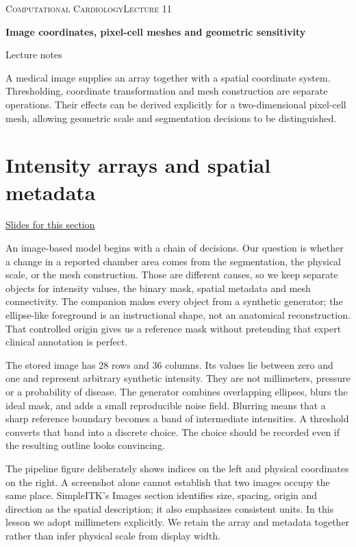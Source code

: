 \documentclass[11pt,letterpaper]{article}
\theoremstyle{definition}\newtheorem{definition}{Definition}\newtheorem{example}{Example}
\numberwithin{equation}{section}
\begin{document}
{\small\scshape Computational Cardiology\hfill Lecture 11}\par\medskip
{\raggedright{}\LARGE\bfseries\color{ink} Image coordinates, pixel-cell meshes and geometric sensitivity\par}\medskip
{\small Lecture notes}\par\bigskip
A medical image supplies an array together with a spatial coordinate system. Thresholding, coordinate transformation and mesh construction are separate operations. Their effects can be derived explicitly for a two-dimensional pixel-cell mesh, allowing geometric scale and segmentation decisions to be distinguished.

\section{Intensity arrays and spatial metadata}
\hypertarget{note-intensity-arrays-and-spatial-metadata}{}\label{note:intensity-arrays-and-spatial-metadata}
{\small \href{slides.html\#frame=an-intensity-array-and-a-geometric-image\&step=1}{Slides for this section}}\par
An image-based model begins with a chain of decisions. Our question is whether a change in a reported chamber area comes from the segmentation, the physical scale, or the mesh construction. Those are different causes, so we keep separate objects for intensity values, the binary mask, spatial metadata and mesh connectivity. The companion makes every object from a synthetic generator; the ellipse-like foreground is an instructional shape, not an anatomical reconstruction. That controlled origin gives us a reference mask without pretending that expert clinical annotation is perfect.

The stored image has 28 rows and 36 columns. Its values lie between zero and one and represent arbitrary synthetic intensity. They are not millimeters, pressure or a probability of disease. The generator combines overlapping ellipses, blurs the ideal mask, and adds a small reproducible noise field. Blurring means that a sharp reference boundary becomes a band of intermediate intensities. A threshold converts that band into a discrete choice. The choice should be recorded even if the resulting outline looks convincing.

The pipeline figure deliberately shows indices on the left and physical coordinates on the right. A screenshot alone cannot establish that two images occupy the same place. SimpleITK's Images section identifies size, spacing, origin and direction as the spatial description; it also emphasizes consistent units. In this lesson we adopt millimeters explicitly. We retain the array and metadata together rather than infer physical scale from display width.
\end{document}
